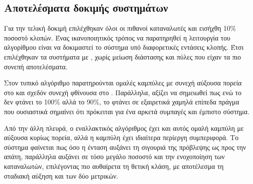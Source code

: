 \subsection{Αποτελέσματα δοκιμής συστημάτων}
Για την τελική δοκιμή επιλέχθηκαν όλοι οι πιθανοί καταναλωτές και εισήχθη 10\% ποσοστό κλοπών. Ένας ικανοποιητικός τρόπος να παρατηρηθεί η λειτουργία του αλγορίθμου είναι να δοκιμαστεί το σύστημα υπό διαφορετικές εντάσεις κλοπής. Έτσι επιλέχθηκαν τα συστήματα με , χωρίς μείωση διάστασης και πύλες  που είχαν τα πιο συνεπή αποτελέσματα.\par
Στον τυπικό αλγόριθμο παρατηρούνται ομαλές καμπύλες με συνεχή αύξουσα πορεία στο  και σχεδόν συνεχή φθίνουσα στο . Παράλληλα, αξίζει να σημειωθεί πως ενώ το  δεν φτάνει το 100\% αλλά το 90\%, το  φτάνει σε εξαιρετικά χαμηλά επίπεδα πράγμα που ουσιαστικά σημαίνει ότι πρόκειται για ένα αρκετά συμπαγές και έμπιστο σύστημα.\par
Από την άλλη πλευρά, ο εναλλακτικός αλγόριθμος έχει και αυτός ομαλή καμπύλη  με αύξουσα κυρίως πορεία, αλλά η καμπύλη  έχει ιδιαίτερα περίεργη συμπεριφορά. Το σύστημα φαίνεται πως όσο η ένταση αυξάνει τη σιγουριά της πρόβλεψης ως προς την απάτη, παράλληλα αυξάνει σε τόσο μεγάλο ποσοστό και την ενοχοποίηση των καταναλωτών, επιλέγοντας πιο αυθαίρετα τη θετική κλάση, με αποτέλεσμα τη σταδιακή αύξηση και των δύο μετρικών.
